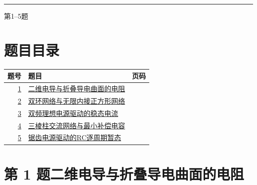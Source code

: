 \documentclass[UTF8,fontset=fandol,a4paper,11pt]{ctexart}
\begin{document}

\thispagestyle{empty}\vspace*{22mm}

\par\vspace{12mm}

\par\vspace{12mm}

\par\vspace{9mm}

\noindent\textcolor{accent}{\rule{\linewidth}{1pt}}\par\vspace{9mm}

\noindent 第1--5题\par\vfill\clearpage

\section*{题目目录}

\begin{longtable}{@{}r p{113mm} r@{}}\toprule 题号 & 题目 & 页码\\\midrule

\hyperref[q:1]{1} & \hyperref[q:1]{二维电导与折叠导电曲面的电阻} & \pageref{q:1} \\

\hyperref[q:2]{2} & \hyperref[q:2]{双环网络与无限内接正方形网络} & \pageref{q:2} \\

\hyperref[q:3]{3} & \hyperref[q:3]{双频理想电源驱动的稳态电流} & \pageref{q:3} \\

\hyperref[q:4]{4} & \hyperref[q:4]{三棱柱交流网络与最小补偿电容} & \pageref{q:4} \\

\hyperref[q:5]{5} & \hyperref[q:5]{锯齿电源驱动的RC逐周期暂态} & \pageref{q:5} \\

\bottomrule\end{longtable}

\clearpage


\section*{第 1 题\quad 二维电导与折叠导电曲面的电阻}\label{q:1}
\end{document}

